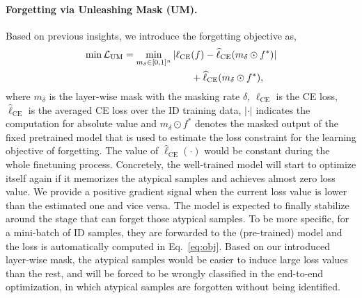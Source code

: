 \documentclass{article}
\theoremstyle{plain}
\theoremstyle{definition}
\theoremstyle{remark}
\begin{document}
\paragraph{Forgetting via Unleashing Mask (UM).} Based on previous insights, we introduce the forgetting objective as,
\begin{equation}
\label{eq:obj}
\begin{split}
\scriptsize
\vspace{-4mm}
    \min \mathcal{L}_{\text{UM}} 
=  \min_{m_\delta\in[0,1]^n} |\ell_\text{CE}&(f) - \widehat{\ell}_\text{CE}(m_\delta\odot f^*)|\\
    &+\widehat{\ell}_\text{CE}(m_\delta\odot f^*),
\vspace{-4mm}
\end{split}
\end{equation}
where $m_\delta$ is the layer-wise mask with the masking rate $\delta$, $\ell_\text{CE}$ is the CE loss, $\widehat{\ell}_\text{CE}$ is the averaged CE loss over the ID training data, $|\cdot|$ indicates the computation for absolute value and $m_\delta \odot f^*$ denotes the masked output of the fixed pretrained model that is used to estimate the loss constraint for the learning objective of forgetting. The value of  $\widehat{\ell}_\text{CE}(\cdot)$ would be constant during the whole finetuning process. Concretely, the well-trained model will start to optimize itself again if it memorizes the atypical samples and achieves almost zero loss value. We provide a positive gradient signal when the current loss value is lower than the estimated one and vice versa. The model is expected to finally stabilize around the stage that can forget those atypical samples. To be more specific, for a mini-batch of ID samples, they are forwarded to the (pre-trained) model and the loss is automatically computed in Eq.~\eqref{eq:obj}. Based on our introduced layer-wise mask, the atypical samples would be easier to induce large loss values than the rest, and will be forced to be wrongly classified in the end-to-end optimization, in which atypical samples are forgotten without being identified.
\end{document}
